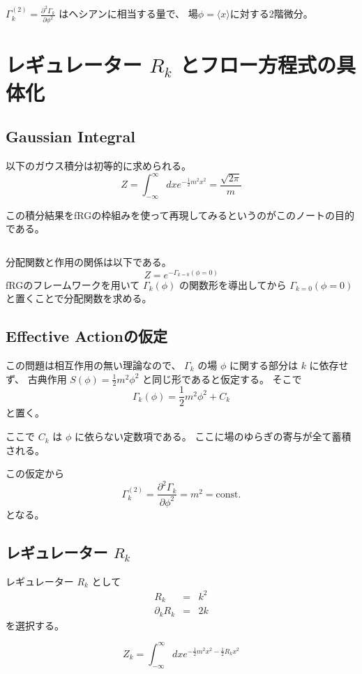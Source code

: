 \documentclass[uplatex,a4j,12pt,dvipdfmx]{jsarticle}
\begin{document}
$\Gamma^{(2)}_{k} = \frac{\partial^{2} \Gamma_{k}}{\partial \phi^{2}}$
はヘシアンに相当する量で、
場$ \phi = \langle x \rangle$に対する2階微分。
\section{レギュレーター $R_{k}$ とフロー方程式の具体化}

\subsection{Gaussian Integral}

以下のガウス積分は初等的に求められる。
\[
	Z =
	\int^{\infty}_{- \infty} dx e^{ -\frac{1}{2} m^{2} x^{2} }
	=
	\frac{ \sqrt{2 \pi} }{ m }
\]

この積分結果をfRGの枠組みを使って再現してみるというのがこのノートの目的である。

${}$

分配関数と作用の関係は以下である。
\[
	Z = e^{-\Gamma_{k=0}(\phi=0)}
\]
fRGのフレームワークを用いて $\Gamma_{k} (\phi)$ の関数形を導出してから
$\Gamma_{k=0}(\phi=0)$ と置くことで分配関数を求める。

\subsection{Effective Actionの仮定}

この問題は相互作用の無い理論なので、
$\Gamma_{k}$ の場 $\phi$ に関する部分は $k$ に依存せず、
古典作用 $S(\phi)=\frac{1}{2} m^{2} \phi^{2}$ と同じ形であると仮定する。
そこで
\[
	\Gamma_{k} (\phi) = \frac{1}{2} m^{2} \phi^{2} + C_{k}
\]
と置く。

ここで $C_{k}$ は $\phi$ に依らない定数項である。
ここに場のゆらぎの寄与が全て蓄積される。

この仮定から
\[
	\Gamma^{(2)}_{k}
	=
	\frac{\partial^{2} \Gamma_{k}}{\partial \phi^{2}}
	=
	m^{2}
	=
	\mathrm{const.}
\]
となる。
\subsection{レギュレーター $R_{k}$}

レギュレーター $R_{k}$ として
\[
	\begin{array}{rcl}
		R_{k}              & = & k^{2} \\
		\partial_{k} R_{k} & = & 2 k
	\end{array}
\]
を選択する。

\[
	Z_{k} =
	\int^{\infty}_{- \infty} dx e^{ -\frac{1}{2} m^{2} x^{2} - \frac{1}{2} R_{k} x^{2} }
\]
\end{document}
